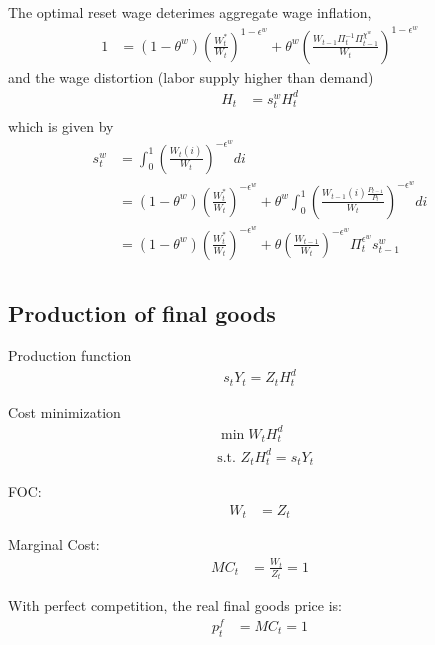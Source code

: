 \documentclass[11pt]{article}
\begin{document}
The optimal reset wage deterimes aggregate wage inflation,
\begin{align*}
	1 &= (1-\theta^w)\left(\frac{W_t^*}{W_t}\right)^{1-\epsilon^w} + \theta^w\left(\frac{W_{t-1}\Pi_t^{-1}\Pi_{t-1}^{\chi^w}}{W_t}\right)^{1-\epsilon^w}
\end{align*}
and the wage distortion (labor supply higher than demand)
\begin{align*}
	H_t &= s_t^w H_t^d \\
\end{align*}
which is given by
\begin{align*}
	s_t^w &= \int_0^1 \left(\frac{W_{t}(i)}{W_t}\right)^{-\epsilon^w}di \\
	&= (1-\theta^w)\left(\frac{W_t^*}{W_t}\right)^{-\epsilon^w} + \theta^w \int_0^1   \left(\frac{W_{t-1}(i)\frac{P_{t-1}}{P_t}}{W_t}\right)^{-\epsilon^w}di \\
	&=(1-\theta^w)\left(\frac{W_t^*}{W_t}\right)^{-\epsilon^w} + \theta \left(\frac{W_{t-1}}{W_t}\right)^{-\epsilon^w}\Pi_t^{\epsilon^w} s_{t-1}^w \\
\end{align*}

\subsection{Production of final goods}

Production function
\begin{align*}
	s_t Y_t = Z_t H_t^d
\end{align*}

Cost minimization
\begin{align*}
	&\min  W_t H_t^d \\
	&\text{s.t. } Z_t  H_t^d = s_t Y_t
\end{align*}

FOC:
\begin{align*}
	W_t &= Z_t 
\end{align*}

Marginal Cost:
\begin{align*}
	MC_t &=\frac{W_t}{Z_t} =1
\end{align*}

With perfect competition, the real final goods price is:
\begin{align*}
	p_t^f &=MC_t = 1
\end{align*}


\end{document}
